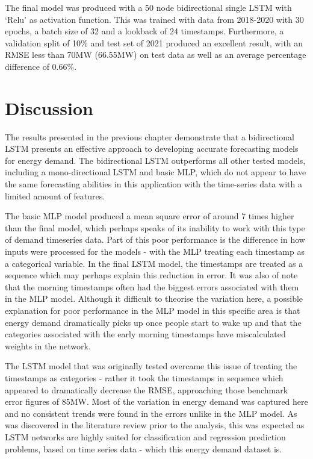 \documentclass[mstat,12pt]{unswthesis}
\begin{document}
The final model was produced with a 50 node bidirectional single LSTM
with `Relu' as activation function. This was trained with data from
2018-2020 with 30 epochs, a batch size of 32 and a lookback of 24
timestamps. Furthermore, a validation split of 10\% and test set of 2021
produced an excellent result, with an RMSE less than 70MW (66.55MW) on
test data as well as an average percentage difference of 0.66\%.

\hypertarget{discussion}{%
\chapter{Discussion}\label{discussion}}

The results presented in the previous chapter demonstrate that a
bidirectional LSTM presents an effective approach to developing accurate
forecasting models for energy demand. The bidirectional LSTM outperforms
all other tested models, including a mono-directional LSTM and basic
MLP, which do not appear to have the same forecasting abilities in this
application with the time-series data with a limited amount of features.

\bigskip

The basic MLP model produced a mean square error of around 7 times
higher than the final model, which perhaps speaks of its inability to
work with this type of demand timeseries data. Part of this poor
performance is the difference in how inputs were processed for the
models - with the MLP treating each timestamp as a categorical variable.
In the final LSTM model, the timestamps are treated as a sequence which
may perhaps explain this reduction in error. It was also of note that
the morning timestamps often had the biggest errors associated with them
in the MLP model. Although it difficult to theorise the variation here,
a possible explanation for poor performance in the MLP model in this
specific area is that energy demand dramatically picks up once people
start to wake up and that the categories associated with the early
morning timestamps have miscalculated weights in the network.

\bigskip

The LSTM model that was originally tested overcame this issue of
treating the timestamps as categories - rather it took the timestamps in
sequence which appeared to dramatically decrease the RMSE, approaching
those benchmark error figures of 85MW. Most of the variation in energy
demand was captured here and no consistent trends were found in the
errors unlike in the MLP model. As was discovered in the literature
review prior to the analysis, this was expected as LSTM networks are
highly suited for classification and regression prediction problems,
based on time series data - which this energy demand dataset is.
\end{document}
